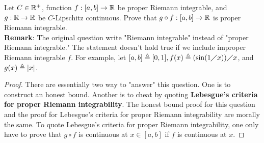 \documentclass{report}
\begin{document}
\begin{question}{}{}
Let $C\in\mathbb{R}^+$, function $f:[a,b]\rightarrow \mathbb{R}$ be proper Riemann integrable, and $g:\mathbb{R}\rightarrow \mathbb{R}$ be $C$-Lipschitz continuous. Prove that $g\circ f:[a,b]\rightarrow \mathbb{R}$ is proper Riemann integrable.\\ 

\textbf{Remark}: The original question write "Riemann integrable" instead of "proper Riemann integrable." The statement doesn't  hold true if we include improper Riemann integrable $f$. For example, let  $[a,b]\triangleq [0,1],f(x)\triangleq (\sin (1\diagup x))\diagup x$, and $g(x)\triangleq \left|x\right|$. 
\end{question}
\begin{proof}
There are essentially two way to "answer" this question. One is to construct an honest bound. Another is to cheat by quoting \textbf{Lebesgue's criteria for proper Riemann integrability}. The honest bound proof for this question and the proof for Lebesgue's criteria for proper Riemann integrability are morally the same. To quote Lebesgue's criteria for proper Riemann integrability, one only have to prove that $g\circ f$ is continuous at $x\in [a,b]$ if $f$ is continuous at  $x$.  
\end{proof}
\end{document}
